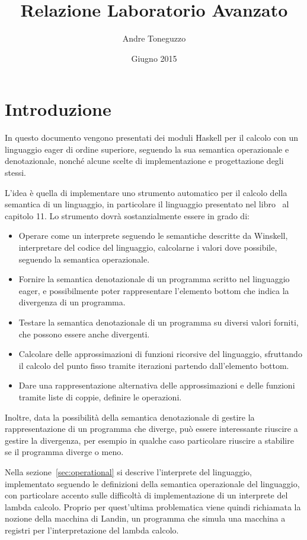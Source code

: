 \documentclass{article}
\title{Relazione Laboratorio Avanzato}
\author{Andre Toneguzzo}
\date{Giugno 2015}
\begin{document}
\maketitle

\section{Introduzione}
In questo documento vengono presentati dei moduli Haskell per il calcolo  con un linguaggio eager di ordine superiore, seguendo la sua semantica operazionale e denotazionale, nonché alcune scelte di implementazione e progettazione degli stessi.

L'idea è quella di implementare uno strumento automatico per il calcolo della semantica di un linguaggio, in particolare il linguaggio presentato nel libro~\cite{Winskel} al capitolo 11. Lo strumento dovrà sostanzialmente essere in grado di:

\begin{itemize}
	\item Operare come un interprete seguendo le semantiche descritte da Winskell, interpretare del codice del linguaggio, calcolarne i valori dove possibile, seguendo la semantica operazionale.
	\item Fornire la semantica denotazionale di un programma scritto nel linguaggio eager, e possibilmente poter rappresentare l'elemento bottom che indica la divergenza di un programma.
	\item Testare la semantica denotazionale di un programma su diversi valori forniti, che possono essere anche divergenti.
	\item Calcolare delle approssimazioni di funzioni ricorsive del linguaggio, sfruttando il calcolo del punto fisso tramite iterazioni partendo dall'elemento bottom.
	\item Dare una rappresentazione alternativa delle approssimazioni e delle funzioni tramite liste di coppie, definire le operazioni.
\end{itemize}
Inoltre, data la possibilità della semantica denotazionale di gestire la rappresentazione di un programma che diverge, può essere interessante riuscire a gestire la divergenza, per esempio in qualche caso particolare riuscire a stabilire se il programma diverge o meno.

Nella sezione~\ref{sec:operational} si descrive l'interprete del linguaggio, implementato seguendo le definizioni della semantica operazionale del linguaggio, con particolare accento sulle difficoltà di implementazione di un interprete del lambda calcolo. Proprio per quest'ultima problematica viene quindi richiamata la nozione della macchina di Landin, un programma che simula una macchina a registri per l'interpretazione del lambda calcolo.
\end{document}
